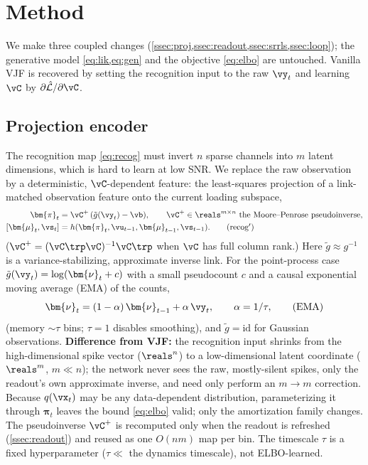 \documentclass[11pt]{article}
\newcommand{\vmu}{\bm{\mu}}
\newcommand{\vnu}{\bm{\nu}}
\newcommand{\vpi}{\bm{\pi}}
\begin{document}
\section{Method}\label{sec:method}
We make three coupled changes (\cref{ssec:proj,ssec:readout,ssec:srrls,ssec:loop}); the generative
model \cref{eq:lik,eq:gen} and the objective \cref{eq:elbo} are untouched. Vanilla VJF is
recovered by setting the recognition input to the raw $\vy_t$ and learning $\vC$ by
$\partial\hat{\mathcal L}/\partial\vC$.

\subsection{Projection encoder}\label{ssec:proj}
The recognition map \cref{eq:recog} must invert $n$ sparse channels into $m$ latent dimensions,
which is hard to learn at low SNR. We replace the raw observation by a deterministic,
$\vC$-dependent feature: the least-squares projection of a link-matched observation feature onto
the current loading subspace,
\begin{align}
  \vpi_t &= \vC^{+}\,(\tilde g(\vy_t)-\vb),\qquad
     \vC^{+}\in\reals^{m\times n}\ \text{the Moore--Penrose pseudoinverse}, \label{eq:proj}\\
  [\vmu_t,\vs_t] &= h(\vpi_t,\vu_{t-1},\vmu_{t-1},\vs_{t-1}). \tag{recog$'$}
\end{align}
($\vC^{+}=(\vC\trp\vC)^{-1}\vC\trp$ when $\vC$ has full column rank.) Here $\tilde g\approx g^{-1}$
is a variance-stabilizing, approximate inverse link. For the point-process case
$\tilde g(\vy_t)=\log(\vnu_t+c)$ with a small pseudocount $c$ and a causal exponential moving
average (EMA) of the counts,
\begin{equation}
  \vnu_t = (1-\alpha)\,\vnu_{t-1}+\alpha\,\vy_t,\qquad \alpha=1/\tau, \tag{EMA}\label{eq:ema}
\end{equation}
(memory $\sim\tau$ bins; $\tau{=}1$ disables smoothing), and $\tilde g=\mathrm{id}$ for Gaussian
observations. \textbf{Difference from VJF:} the recognition input shrinks from the
high-dimensional spike vector ($\reals^n$) to a low-dimensional latent coordinate ($\reals^m$,
$m\!\ll\!n$); the network never sees the raw, mostly-silent spikes, only the readout's own
approximate inverse, and need only perform an $m\!\to\!m$ correction. Because $q(\vx_t)$ may be
any data-dependent distribution, parameterizing it through $\vpi_t$ leaves the bound
\cref{eq:elbo} valid; only the amortization family changes. The pseudoinverse $\vC^{+}$ is
recomputed only when the readout is refreshed (\cref{ssec:readout}) and reused as one $O(nm)$ map
per bin. The timescale $\tau$ is a fixed hyperparameter ($\tau\ll$ the dynamics timescale), not
ELBO-learned.
\end{document}
